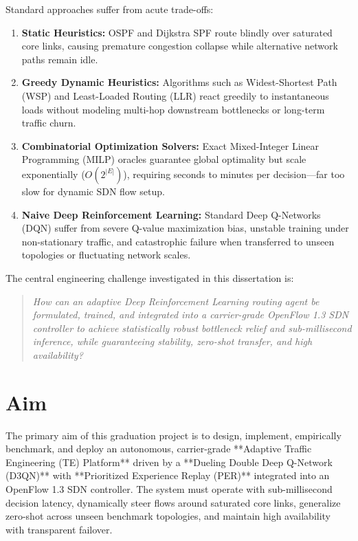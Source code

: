 \documentclass[12pt,a4paper,oneside]{report}
\begin{document}
Standard approaches suffer from acute trade-offs:
\begin{enumerate}
  \item \textbf{Static Heuristics:} OSPF and Dijkstra SPF route blindly over saturated core links, causing premature congestion collapse while alternative network paths remain idle.
  \item \textbf{Greedy Dynamic Heuristics:} Algorithms such as Widest-Shortest Path (WSP) and Least-Loaded Routing (LLR) react greedily to instantaneous loads without modeling multi-hop downstream bottlenecks or long-term traffic churn.
  \item \textbf{Combinatorial Optimization Solvers:} Exact Mixed-Integer Linear Programming (MILP) oracles guarantee global optimality but scale exponentially ($O(2^{|E|})$), requiring seconds to minutes per decision---far too slow for dynamic SDN flow setup.
  \item \textbf{Naive Deep Reinforcement Learning:} Standard Deep Q-Networks (DQN) suffer from severe Q-value maximization bias, unstable training under non-stationary traffic, and catastrophic failure when transferred to unseen topologies or fluctuating network scales.
\end{enumerate}

The central engineering challenge investigated in this dissertation is:
\begin{quote}
\textit{How can an adaptive Deep Reinforcement Learning routing agent be formulated, trained, and integrated into a carrier-grade OpenFlow 1.3 SDN controller to achieve statistically robust bottleneck relief and sub-millisecond inference, while guaranteeing stability, zero-shot transfer, and high availability?}
\end{quote}

\section{Aim}
The primary aim of this graduation project is to design, implement, empirically benchmark, and deploy an autonomous, carrier-grade **Adaptive Traffic Engineering (TE) Platform** driven by a **Dueling Double Deep Q-Network (D3QN)** with **Prioritized Experience Replay (PER)** integrated into an OpenFlow 1.3 SDN controller. The system must operate with sub-millisecond decision latency, dynamically steer flows around saturated core links, generalize zero-shot across unseen benchmark topologies, and maintain high availability with transparent failover.
\end{document}

